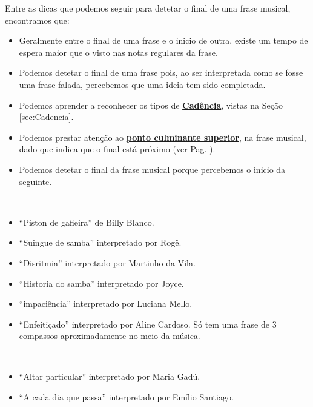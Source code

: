 \label{pos:detetandofinalfrase}
Entre as dicas que podemos seguir para detetar o final de uma frase musical, encontramos que:
\begin{itemize}
\item Geralmente entre o final de uma frase e o inicio de outra, 
existe um tempo de espera maior que o visto nas notas regulares da frase.
\item Podemos detetar o final de uma frase pois, 
ao ser interpretada como se fosse uma frase falada, 
percebemos que uma ideia tem sido completada.
\item Podemos aprender a reconhecer os tipos de \hyperref[sec:Cadencia]{\textbf{Cadência}},
vistas na Seção \ref{sec:Cadencia}.
\item Podemos prestar atenção ao \hyperref[ref:PontoCulminanteSuperior]{\textbf{ponto culminante superior}},
na frase musical, dado que indica que o final está próximo (ver Pag. \pageref{ref:PontoCulminanteSuperior}).
\item Podemos detetar o final da frase musical porque percebemos o inicio da seguinte.
\end{itemize}


\begin{example} ~
\label{ex:frasesde4compassos}
\begin{itemize}
\item ``Piston de gafieira'' de Billy Blanco.
\item ``Suingue de samba'' interpretado por Rogê.
\item ``Disritmia'' interpretado por Martinho da Vila.
\item ``Historia do samba'' interpretado por Joyce. %
\item ``impaciência'' interpretado por Luciana Mello.
\item ``Enfeitiçado'' interpretado por Aline Cardoso. 
Só tem uma frase de 3 compassos aproximadamente no meio da música.
\end{itemize}
\end{example}


\begin{example} ~
\begin{itemize}
\item ``Altar particular'' interpretado por Maria Gadú. 
\item ``A cada dia que passa'' interpretado por Emílio Santiago.
\end{itemize}
\end{example}

